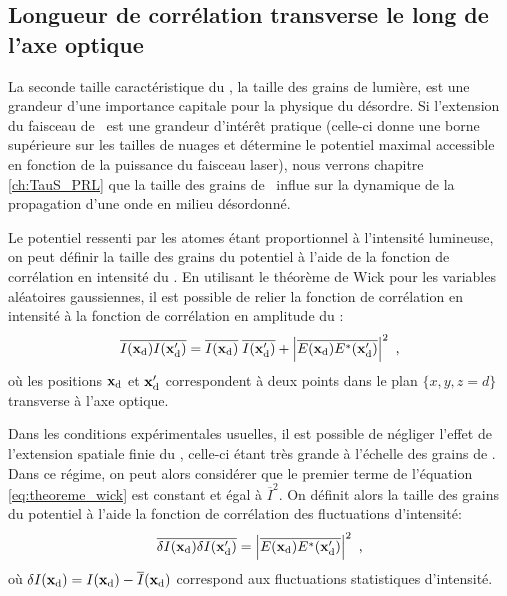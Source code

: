 \subsection{Longueur de corrélation transverse le long de l'axe optique}
\label{sc:correlation_transverse}
La seconde taille caractéristique du \speckle , la taille des grains de lumière, est une grandeur d'une importance capitale pour la physique du désordre. Si l'extension du faisceau de \speckle\ est une grandeur d'intérêt pratique (celle-ci donne une borne supérieure sur les tailles de nuages et détermine le potentiel maximal accessible en fonction de la puissance du faisceau laser), nous verrons chapitre \ref{ch:TauS_PRL} que la taille des grains de \speckle\ influe sur la dynamique de la propagation d'une onde en milieu désordonné.

Le potentiel ressenti par les atomes étant proportionnel à l'intensité lumineuse, on peut définir la taille des grains du potentiel à l'aide de la fonction de corrélation en intensité du \speckle . En utilisant le théorème de Wick pour les variables aléatoires gaussiennes, il est possible de relier la fonction de corrélation en intensité à la fonction de corrélation en amplitude du \speckle :
\begin{equation}
\overline{I(\mathbf{x}_{\mathrm{d}}) I(\mathbf{x}_{\mathrm{d}}')}=\overline{I(\mathbf{x}_{\mathrm{d}})}\;\overline{I(\mathbf{x}_{\mathrm{d}}')} + \left| \overline{E(\mathbf{x}_{\mathrm{d}})E^*(\mathbf{x}_{\mathrm{d}}')} \right|^2 \text{ ,}
\label{eq:theoreme_wick}
\end{equation}
où les positions $\mathbf{x}_{\mathrm{d}}$ et $\mathbf{x}_{\mathrm{d}}'$ correspondent à deux points dans le plan $\lbrace x,y,z=d\rbrace$ transverse à l'axe optique. 

Dans les conditions expérimentales usuelles, il est possible de négliger l'effet de l'extension spatiale finie du \speckle , celle-ci étant très grande à l'échelle des grains de \speckle . Dans ce régime, on peut alors considérer que le premier terme de l'équation \ref{eq:theoreme_wick} est constant et égal à $\overline{I}^2$. On définit alors la taille des grains du potentiel à l'aide la fonction de corrélation des fluctuations d'intensité:
\begin{equation}
\overline{\delta I(\mathbf{x}_{\mathrm{d}}) \delta I(\mathbf{x}_{\mathrm{d}}')} = \left| \overline{E(\mathbf{x}_{\mathrm{d}})E^*(\mathbf{x}_{\mathrm{d}}')} \right|^2 \text{ ,}
\end{equation}
où $\delta I(\mathbf{x}_{\mathrm{d}})=I(\mathbf{x}_{\mathrm{d}})-\overline{I}(\mathbf{x}_{\mathrm{d}})$ correspond aux fluctuations statistiques d'intensité. 

